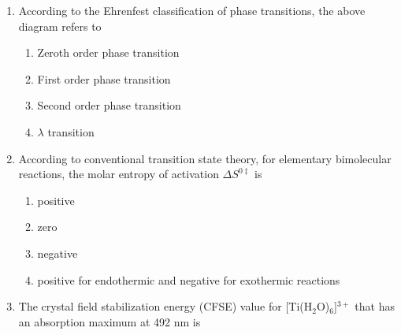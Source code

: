 \documentclass[journal,12pt,onecolumn]{IEEEtran}
\theoremstyle{remark}
\begin{document}
\begin{enumerate}
\item    \hspace{0.5cm}  \hfill{}

\begin{center}
\end{center}

According to the Ehrenfest classification of phase transitions, the above diagram refers to

\begin{multicols}{2}
\begin{enumerate}
    \item Zeroth order phase transition
    \item First order phase transition
    \item Second order phase transition
    \item $\lambda$ transition
\end{enumerate}
\end{multicols}
 

\item    \hspace{0.5cm} According to conventional transition state theory, for elementary bimolecular reactions, the molar entropy of activation $\Delta S^{0\ddagger}$ is  \hfill{}

\begin{multicols}{2}
\begin{enumerate}
    \item positive
    \item zero
    \item negative
    \item positive for endothermic and negative for exothermic reactions
\end{enumerate}
\end{multicols}


\item    \hspace{0.5cm} The crystal field stabilization energy (CFSE) value for [Ti(H$_2$O)$_6$]$^{3+}$ that has an absorption maximum at 492 nm is  \hfill{}


\end{enumerate}
\end{document}
